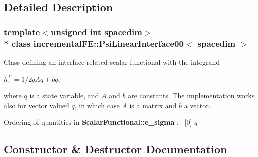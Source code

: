 \subsection{Detailed Description}
\subsubsection*{template$<$unsigned int spacedim$>$\\*
class incremental\+F\+E\+::\+Psi\+Linear\+Interface00$<$ spacedim $>$}

Class defining an interface related scalar functional with the integrand

$h^\Sigma_\tau = 1/2 q A q + b q$,

where $q$ is a state variable, and $A$ and $b$ are constants. The implementation works also for vector valued $q$, in which case $A$ is a matrix and $b$ a vector.

Ordering of quantities in {\bf Scalar\+Functional\+::e\+\_\+sigma} \+:~\newline
 \mbox{[}0\mbox{]} $q$ 

\subsection{Constructor \& Destructor Documentation}
